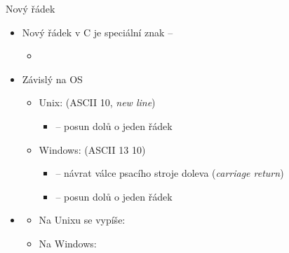 \begin{frame}{Nový řádek}

  \begin{itemize}
    \item Nový řádek v C je speciální znak -- \code{\\n}
    \begin{itemize}
      \item {}
    \end{itemize}

    \pause

    \item Závislý na OS
    \begin{itemize}
      \item Unix: \code{\\n} (ASCII 10, \textit{new line})
      \begin{itemize}
	\item \code{\\n} -- posun dolů o jeden řádek
      \end{itemize}

      \pause

      \item Windows: \code{\\r\\n} (ASCII 13 10)
      \begin{itemize}
	\item \code{\\r} -- návrat válce psacího stroje doleva
	  (\textit{carriage return})
	\item \code{\\n} -- posun dolů o jeden řádek
      \end{itemize}
    \end{itemize}

    \pause

    \item {}
    \begin{itemize}
      \item Na Unixu se vypíše: 
      \item Na Windows: 
    \end{itemize}

  \end{itemize}

\end{frame}

